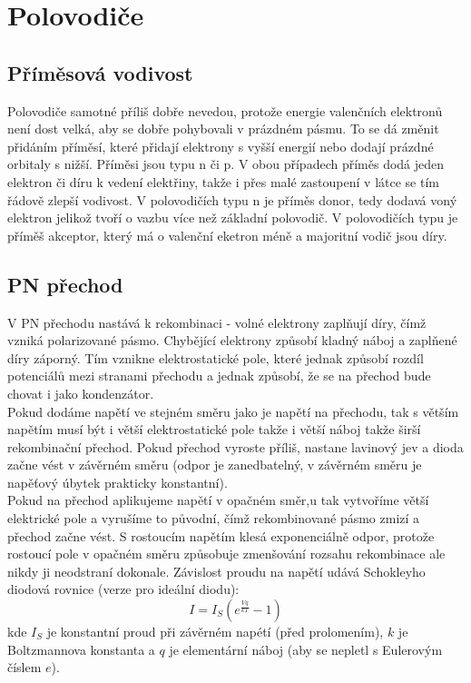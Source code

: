 \documentclass[titlepage]{report}
\begin{document}
\chapter{Polovodiče}
\section{Příměsová vodivost}
Polovodiče samotné příliš dobře nevedou, protože energie valenčních elektronů není dost velká, aby se dobře pohybovali v prázdném pásmu. To se dá změnit přidáním příměsí, které přidají elektrony s vyšší energií nebo dodají prázdné orbitaly s nižší. Příměsi jsou typu n či p. V obou případech příměs dodá jeden elektron či díru k vedení elektřiny, takže i přes malé zastoupení v látce se tím řádově zlepší vodivost. V polovodičích typu n je příměs donor, tedy dodavá voný elektron jelikož tvoří o vazbu více než základní polovodič. V polovodičích typu je příměš akceptor, který má o valenční eketron méně a majoritní vodič jsou díry.
\section{PN přechod}
V PN přechodu nastává k rekombinaci - volné elektrony zaplňují díry, čímž vzniká polarizované pásmo. Chybějící elektrony způsobí kladný náboj a zaplňené díry záporný. Tím vznikne elektrostatické pole, které jednak způsobí rozdíl potenciálů mezi stranami přechodu a jednak způsobí, že se na přechod bude chovat i jako kondenzátor.\\
Pokud dodáme napětí ve stejném směru jako je napětí na přechodu, tak s větším napětím musí být i větší elektrostatické pole takže i větší náboj takže širší rekombinační přechod. Pokud přechod vyroste příliš, nastane lavinový jev a dioda začne vést v závěrném směru (odpor je zanedbatelný, v závěrném směru je napěťový úbytek prakticky konstantní).\\
Pokud na přechod aplikujeme napětí v opačném směr,u tak vytvoříme větší elektrické pole a vyrušíme to původní, čímž rekombinované pásmo zmizí a přechod začne vést. S rostoucím napětím klesá exponenciálně odpor, protože rostoucí pole v opačném směru způsobuje zmenšování rozsahu rekombinace ale nikdy ji neodstraní dokonale. Závislost proudu na napětí udává Schokleyho diodová rovnice (verze pro ideální diodu):\\
\begin{equation}
I = I_S (e^{\frac{Vq}{kT}} - 1)
\end{equation}
kde $I_S$ je konstantní proud při závěrném napétí (před prolomením), $k$ je Boltzmannova konstanta a $q$ je elementární náboj (aby se nepletl s Eulerovým číslem $e$).
\end{document}
